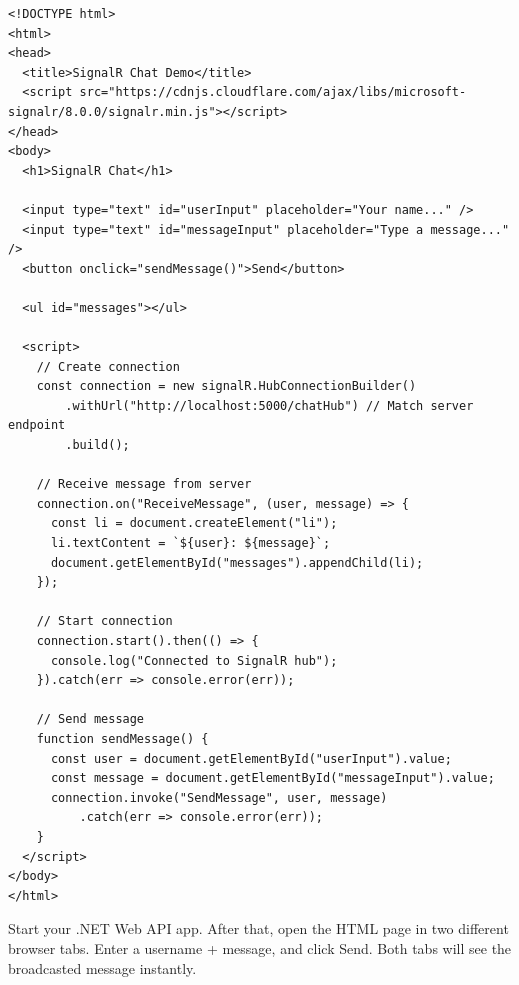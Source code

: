 \begin{lstlisting}
<!DOCTYPE html>
<html>
<head>
  <title>SignalR Chat Demo</title>
  <script src="https://cdnjs.cloudflare.com/ajax/libs/microsoft-signalr/8.0.0/signalr.min.js"></script>
</head>
<body>
  <h1>SignalR Chat</h1>

  <input type="text" id="userInput" placeholder="Your name..." />
  <input type="text" id="messageInput" placeholder="Type a message..." />
  <button onclick="sendMessage()">Send</button>

  <ul id="messages"></ul>

  <script>
    // Create connection
    const connection = new signalR.HubConnectionBuilder()
        .withUrl("http://localhost:5000/chatHub") // Match server endpoint
        .build();

    // Receive message from server
    connection.on("ReceiveMessage", (user, message) => {
      const li = document.createElement("li");
      li.textContent = `${user}: ${message}`;
      document.getElementById("messages").appendChild(li);
    });

    // Start connection
    connection.start().then(() => {
      console.log("Connected to SignalR hub");
    }).catch(err => console.error(err));

    // Send message
    function sendMessage() {
      const user = document.getElementById("userInput").value;
      const message = document.getElementById("messageInput").value;
      connection.invoke("SendMessage", user, message)
          .catch(err => console.error(err));
    }
  </script>
</body>
</html>

\end{lstlisting}

Start your .NET Web API app. After that, open the HTML page in two different browser tabs. Enter a username + message, and click Send. Both tabs will see the broadcasted message instantly.

\medskip

